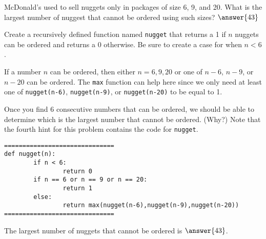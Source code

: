 \documentclass{ximera}
\begin{document}
\begin{question}
McDonald's used to sell nuggets only in packages of size 6, 9, and 20. What is the largest number of nuggest that cannot be ordered using such sizes? $\answer{43}$
	\begin{hint}
Create a recursively defined function named \verb|nugget| that returns a 1 if $n$ nuggets can be ordered and returns a 0 otherwise. Be sure to create a case for when $n<6$.
	\end{hint}
	\begin{hint}
	If a number $n$ can be ordered, then either $n=6,9,20$ or one of $n-6$, $n-9$, or $n-20$ can be ordered. The \verb|max| function can help here since we only need at least one of \verb|nugget(n-6)|, \verb|nugget(n-9)|, or \verb|nugget(n-20)| to be equal to 1.
	\end{hint}
	\begin{hint}
	Once you find 6 consecutive numbers that can be ordered, we should be able to determine which is the largest number that cannot be ordered. (Why?) Note that the fourth hint for this problem contains the code for \verb|nugget|.
	\end{hint}
\begin{hint}
\begin{verbatim}
==============================
def nugget(n):
        if n < 6:
                return 0
        if n == 6 or n == 9 or n == 20:
                return 1
        else:
                return max(nugget(n-6),nugget(n-9),nugget(n-20))
==============================
\end{verbatim}
	\end{hint}
The largest number of nuggets that cannot be ordered is $\answer{43}$.
\end{question}
\end{document}
